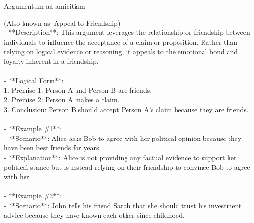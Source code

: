 \documentclass[a4paper,12pt,single,pdftex]{scrbook}
\begin{document}
  

Argumentum ad amicitiam
    
      (Also known as:  Appeal to Friendship)
    \\

  
    
      - **Description**: This argument leverages the relationship or friendship between individuals to influence the acceptance of a claim or proposition. Rather than relying on logical evidence or reasoning, it appeals to the emotional bond and loyalty inherent in a friendship.
    \\

    
      
    \\

    
      - **Logical Form**:
    \\

    
        1. Premise 1: Person A and Person B are friends.
    \\

    
        2. Premise 2: Person A makes a claim.
    \\

    
        3. Conclusion: Person B should accept Person A's claim because they are friends.
    \\

    
      
    \\

    
      - **Example \#1**:
    \\

    
        - **Scenario**: Alice asks Bob to agree with her political opinion because they have been best friends for years.
    \\

    
        - **Explanation**: Alice is not providing any factual evidence to support her political stance but is instead relying on their friendship to convince Bob to agree with her.
    \\

    
      
    \\

    
      - **Example \#2**:
    \\

    
        - **Scenario**: John tells his friend Sarah that she should trust his investment advice because they have known each other since childhood.
    \\
\end{document}
